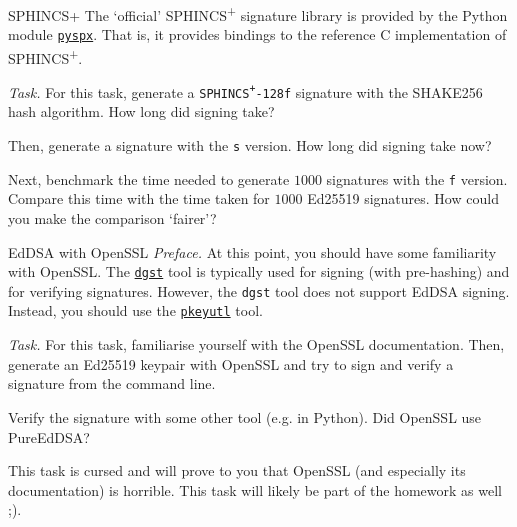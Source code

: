 \documentclass{practice}
\begin{document}
\begin{task}{SPHINCS+}
  The `official' SPHINCS\textsuperscript{+} signature library is provided by the Python module \href{https://github.com/sphincs/pyspx}{\texttt{pyspx}}.
  That is, it provides bindings to the reference C implementation of SPHINCS\textsuperscript{+}.

  \textit{Task.}
  For this task, generate a \texttt{SPHINCS\textsuperscript{+}-128f} signature with the SHAKE256 hash algorithm.
  How long did signing take?

  Then, generate a signature with the \texttt{s} version.
  How long did signing take now?

  Next, benchmark the time needed to generate $1000$ signatures with the \texttt{f} version.
  Compare this time with the time taken for $1000$ Ed25519 signatures.
  How could you make the comparison `fairer'?
\end{task}

\begin{task}{EdDSA with OpenSSL}
  \textit{Preface.}
  At this point, you should have some familiarity with OpenSSL.
  The \href{https://www.openssl.org/docs/man3.0/man1/openssl-dgst.html}{\texttt{dgst}} tool is typically used for signing (with pre-hashing) and for verifying signatures.
  However, the \texttt{dgst} tool does not support EdDSA signing.
  Instead, you should use the \href{https://www.openssl.org/docs/man3.0/man1/openssl-pkeyutl.html}{\texttt{pkeyutl}} tool.

  \textit{Task.}
  For this task, familiarise yourself with the OpenSSL documentation.
  Then, generate an Ed25519 keypair with OpenSSL and try to sign and verify a signature from the command line.

  Verify the signature with some other tool (e.g. in Python).
  Did OpenSSL use PureEdDSA?

  This task is cursed and will prove to you that OpenSSL (and especially its documentation) is horrible.
  This task will likely be part of the homework as well ;).
\end{task}
\end{document}
